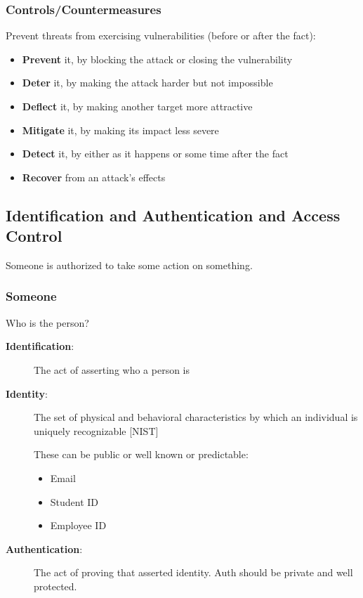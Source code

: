\documentclass[11pt,a4paper]{article}
\begin{document}
\subsubsection{Controls/Countermeasures}
Prevent threats from exercising vulnerabilities (before or after the fact):

\begin{itemize}
    \item \textbf{Prevent} it, by blocking the attack or closing the vulnerability
    \item \textbf{Deter} it, by making the attack harder but not impossible
    \item \textbf{Deflect} it, by making another target more attractive
    \item \textbf{Mitigate} it, by making its impact less severe
    \item \textbf{Detect} it, by either as it happens or some time after the fact
    \item \textbf{Recover} from an attack's effects
\end{itemize}

\subsection{Identification and Authentication and Access Control}

Someone is authorized to take some action on something.

\subsubsection{Someone}
Who is the person?

\begin{description}
    \item[\textbf{Identification}:] The act of asserting who a person is
    
    \item[\textbf{Identity}:] The set of physical and behavioral characteristics by which an individual is uniquely recognizable [NIST]
    
    These can be public or well known or predictable:
    \begin{itemize}
        \item Email
        \item Student ID
        \item Employee ID
    \end{itemize}
    
    \item[\textbf{Authentication}:] The act of proving that asserted identity. Auth should be private and well protected.
\end{description}
\end{document}

